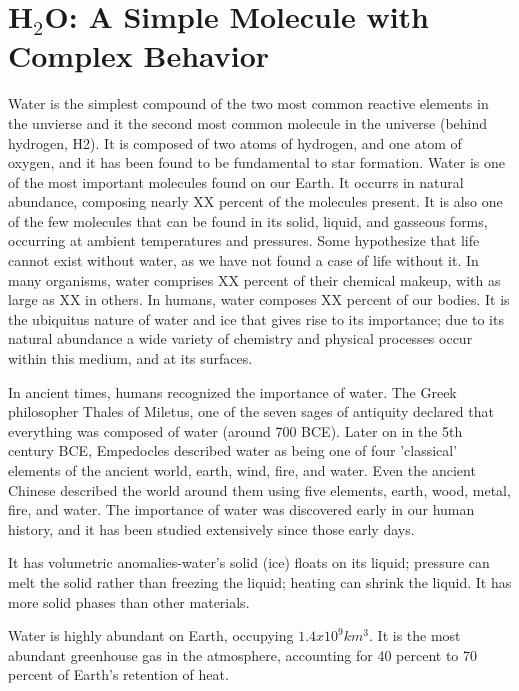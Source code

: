 \section{H$_2$O: A Simple Molecule with Complex Behavior}
Water is the simplest compound of the two most common reactive
elements in the unvierse and it the second most common molecule in the
universe (behind hydrogen, H2). It is composed of two atoms of
hydrogen, and one atom of oxygen, and it has been found to be
fundamental to star formation.  Water is one of the most important
molecules found on our Earth.  It occurrs in natural abundance,
composing nearly XX percent of the molecules present. It is also one
of the few molecules that can be found in its solid, liquid, and
gasseous forms, occurring at ambient temperatures and pressures.  Some
hypothesize that life cannot exist without water, as we have not found
a case of life without it. In many organisms, water comprises XX
percent of their chemical makeup, with as large as XX in others. In
humans, water composes XX percent of our bodies. It is the ubiquitus
nature of water and ice that gives rise to its importance; due to its
natural abundance a wide variety of chemistry and physical processes
occur within this medium, and at its surfaces.

In ancient times, humans recognized the importance of water. The Greek
philosopher Thales of Miletus, one of the seven sages of antiquity
declared that everything was composed of water (around 700 BCE). Later
on in the 5th century BCE, Empedocles described water as being one of
four 'classical' elements of the ancient world, earth, wind, fire, and
water. Even the ancient Chinese described the world around them using
five elements, earth, wood, metal, fire, and water. The importance of
water was discovered early in our human history, and it has been
studied extensively since those early days.  

It has volumetric anomalies-water’s solid (ice) floats on its liquid;
pressure can melt the solid rather than freezing the liquid; heating
can shrink the liquid. It has more solid phases than other materials.

Water is highly abundant on Earth, occupying
$1.4x10^{9} km^{3}$.\cite{2-4} It is the most abundant greenhouse gas
in the atmosphere, accounting for 40 percent to 70 percent of Earth's
retention of heat.

